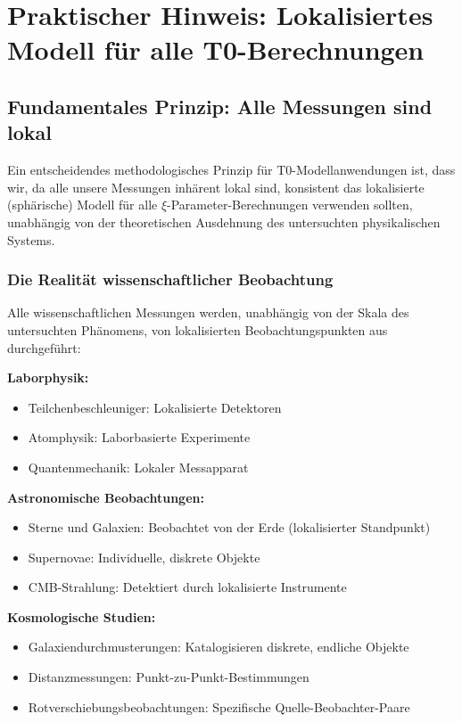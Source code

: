 \documentclass[12pt,a4paper]{article}
\begin{document}
\section{Praktischer Hinweis: Lokalisiertes Modell für alle T0-Berechnungen}
\label{sec:localized_model_universal}

\subsection{Fundamentales Prinzip: Alle Messungen sind lokal}
\label{subsec:all_measurements_local}

Ein entscheidendes methodologisches Prinzip für T0-Modellanwendungen ist, dass wir, da alle unsere Messungen inhärent lokal sind, konsistent das lokalisierte (sphärische) Modell für alle $\xi$-Parameter-Berechnungen verwenden sollten, unabhängig von der theoretischen Ausdehnung des untersuchten physikalischen Systems.

\subsubsection{Die Realität wissenschaftlicher Beobachtung}
\label{subsubsec:reality_scientific_observation}

Alle wissenschaftlichen Messungen werden, unabhängig von der Skala des untersuchten Phänomens, von lokalisierten Beobachtungspunkten aus durchgeführt:

\textbf{Laborphysik:}
\begin{itemize}
	\item Teilchenbeschleuniger: Lokalisierte Detektoren
	\item Atomphysik: Laborbasierte Experimente
	\item Quantenmechanik: Lokaler Messapparat
\end{itemize}

\textbf{Astronomische Beobachtungen:}
\begin{itemize}
	\item Sterne und Galaxien: Beobachtet von der Erde (lokalisierter Standpunkt)
	\item Supernovae: Individuelle, diskrete Objekte  
	\item CMB-Strahlung: Detektiert durch lokalisierte Instrumente
\end{itemize}

\textbf{Kosmologische Studien:}
\begin{itemize}
	\item Galaxiendurchmusterungen: Katalogisieren diskrete, endliche Objekte
	\item Distanzmessungen: Punkt-zu-Punkt-Bestimmungen
	\item Rotverschiebungsbeobachtungen: Spezifische Quelle-Beobachter-Paare
\end{itemize}
\end{document}
